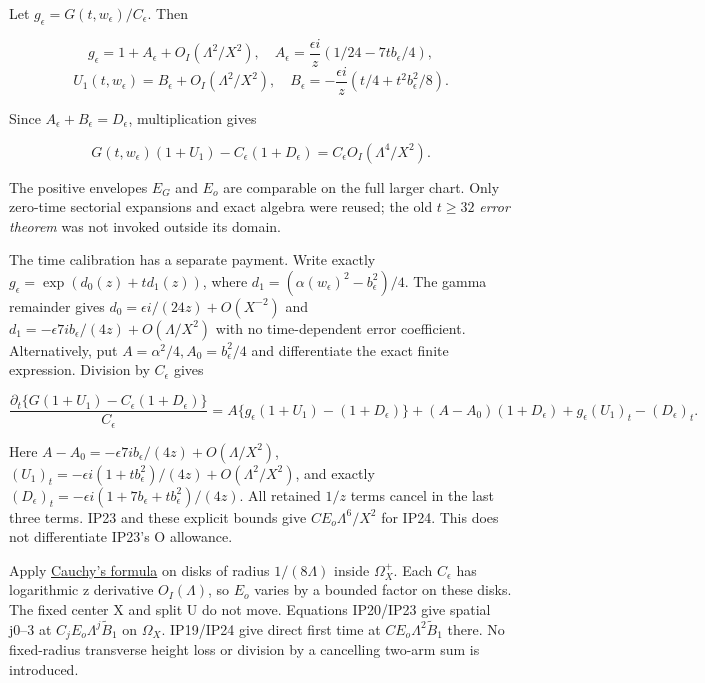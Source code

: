 Let \(g_{\epsilon}=G(t,w_{\epsilon})/C_{\epsilon}\). Then

\[
g_\epsilon=1+A_\epsilon+O_I(\Lambda^2/X^2),\quad
A_\epsilon=\frac{\epsilon i}{z}(1/24-7t b_\epsilon/4),
\]
\[
U_1(t,w_\epsilon)=B_\epsilon+O_I(\Lambda^2/X^2),\quad
B_\epsilon=-\frac{\epsilon i}{z}(t/4+t^2b_\epsilon^2/8).
\tag{IP22}\label{eq:ansatz-ip22}
\]

Since \(A_{\epsilon}+B_{\epsilon}=D_{\epsilon}\), multiplication gives

\[
G(t,w_\epsilon)(1+U_1)-C_\epsilon(1+D_\epsilon)
 =C_\epsilon O_I(\Lambda^4/X^2).
\tag{IP23}\label{eq:ansatz-ip23}
\]

The positive envelopes \(E_{G}\) and \(E_{o}\) are comparable on the full larger chart. Only zero-time sectorial expansions and exact algebra were reused; the old \(t\ge 32\) \emph{error theorem} was not invoked outside its domain.

The time calibration has a separate payment. Write exactly \(g_{\epsilon}=\exp(d_{0}(z)+t d_{1}(z))\), where \(d_{1}=(\alpha(w_{\epsilon})^{2}-b_{\epsilon}^{2})/4\). The gamma remainder gives \(d_{0}=\epsilon i/(24z)+O(X^{-2})\) and \(d_{1}=-\epsilon7i b_{\epsilon}/(4z)+O(\Lambda/X^{2})\) with no time-dependent error coefficient. Alternatively, put \(A=\alpha^{2}/4,A_{0}=b_{\epsilon}^{2}/4\) and differentiate the exact finite expression. Division by \(C_{\epsilon}\) gives

\[
\frac{\partial_t\{G(1+U_1)-C_\epsilon(1+D_\epsilon)\}}{C_\epsilon}
 =A\{g_\epsilon(1+U_1)-(1+D_\epsilon)\}
 +(A-A_0)(1+D_\epsilon)+g_\epsilon(U_1)_t-(D_\epsilon)_t.
\tag{IP24}\label{eq:ansatz-ip24}
\]

Here \(A-A_{0}=-\epsilon7i b_{\epsilon}/(4z)+O(\Lambda/X^{2})\), \((U_{1})_{t}=-\epsilon i(1+t b_{\epsilon}^{2})/(4z)+O(\Lambda^{2}/X^{2})\), and exactly \((D_{\epsilon})_{t}=-\epsilon i(1+7b_{\epsilon}+t b_{\epsilon}^{2})/(4z)\). All retained \(1/z\) terms cancel in the last three terms. IP23 and these explicit bounds give \(C E_{o} \Lambda^{6}/X^{2}\) for IP24. This does not differentiate IP23's O allowance.

Apply \href{https://dlmf.nist.gov/1.9.E31}{Cauchy's formula} on disks of radius \(1/(8 \Lambda)\) inside \(\Omega_{X}^+\). Each \(C_{\epsilon}\) has logarithmic z derivative \(O_{I}(\Lambda)\), so \(E_{o}\) varies by a bounded factor on these disks. The fixed center X and split U do not move. Equations IP20/IP23 give spatial j0--3 at \(C_{j} E_{o} \Lambda^{j} \widetilde B_1\) on \(\Omega_{X}\). IP19/IP24 give direct first time at \(C E_{o} \Lambda^{2} \widetilde B_1\) there. No fixed-radius transverse height loss or division by a cancelling two-arm sum is introduced.

